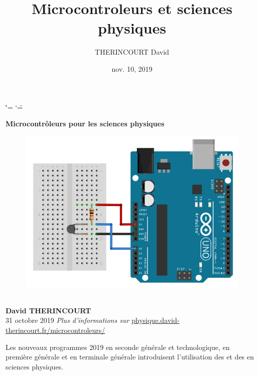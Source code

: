 \documentclass[a4paper,10pt,french]{book}
\title{Microcontroleurs et sciences physiques}
\date{nov. 10, 2019}
\author{THERINCOURT David}
\begin{document}
\ifdefined\shorthandoff
  \ifnum\catcode`\=\string=\active\shorthandoff{=}\fi
  \ifnum\catcode`\"=\active{}\fi
\fi

\pagestyle{empty}

    \begin{titlepage}
    \centering
    \vspace*{40mm} %
    \textbf{\Huge {Microcontrôleurs pour les sciences physiques}}
    \vspace{0mm}
    \begin{figure}[!h]
    \centering
    \includegraphics[scale=0.4]{CTN_Montage.png}
    \end{figure}
    \vspace{0mm}
    \\
    \Large \textbf{{David THERINCOURT}}
    \vspace*{0mm}
    \\
    \small 31 octobre 2019
    \vfill
    \small \textit{Plus d'informations sur }{\href{https://physique.david-therincourt.fr/microcontroleurs/}{physique.david-therincourt.fr/microcontroleurs/}}
    \end{titlepage}
    \clearpage
    \tableofcontents
    \clearpage
    
\pagestyle{plain}
 
\pagestyle{normal}
\label{\detokenize{index::doc}}


Les nouveaux programmes 2019 en seconde générale et technologique, en première générale et en terminale générale introduisent l’utilisation des  et des  en sciences physiques.
\end{document}

